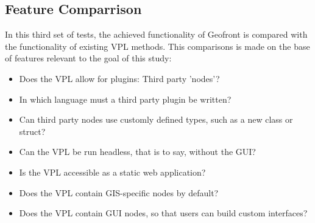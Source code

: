 



\subsection{Feature Comparrison}
\label{sec:method:tests:features}

In this third set of tests, the achieved functionality of Geofront is compared with the functionality of existing VPL methods. 
This comparisons is made on the base of features relevant to the goal of this study:
\begin{itemize}[-]
  \item Does the VPL allow for plugins: Third party 'nodes'?  
  \item In which language must a third party plugin be written?
  \item Can third party nodes use customly defined types, such as a new class or struct?
  \item Can the VPL be run headless, that is to say, without the \ac{GUI}?
  \item Is the VPL accessible as a static web application?
  \item Does the VPL contain GIS-specific nodes by default?
  \item Does the VPL contain \ac{GUI} nodes, so that users can build custom interfaces?
\end{itemize}

